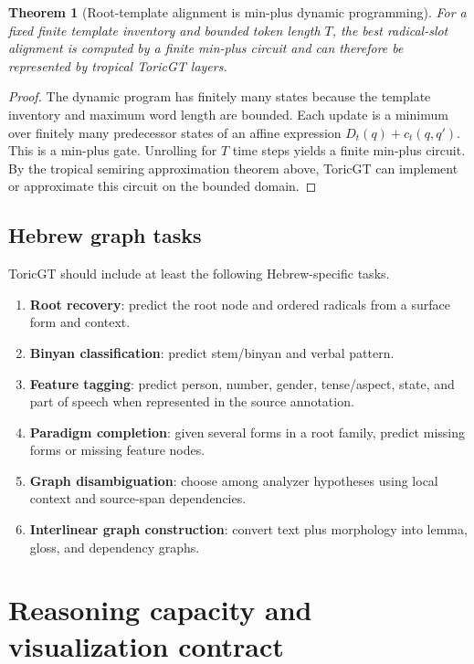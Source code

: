 \documentclass[11pt]{article}
\theoremstyle{definition}
\theoremstyle{plain}
\newtheorem{theorem}[definition]{Theorem}
\theoremstyle{remark}
\numberwithin{equation}{section}
\begin{document}
\begin{theorem}[Root-template alignment is min-plus dynamic programming]
For a fixed finite template inventory and bounded token length $T$, the best radical-slot alignment is computed by a finite min-plus circuit and can therefore be represented by tropical ToricGT layers.
\end{theorem}

\begin{proof}
The dynamic program has finitely many states because the template inventory and maximum word length are bounded.  Each update is a minimum over finitely many predecessor states of an affine expression $D_t(q)+c_t(q,q')$.  This is a min-plus gate.  Unrolling for $T$ time steps yields a finite min-plus circuit.  By the tropical semiring approximation theorem above, ToricGT can implement or approximate this circuit on the bounded domain.
\end{proof}

\subsection{Hebrew graph tasks}

ToricGT should include at least the following Hebrew-specific tasks.
\begin{enumerate}[leftmargin=2em]
  \item \textbf{Root recovery}: predict the root node and ordered radicals from a surface form and context.
  \item \textbf{Binyan classification}: predict stem/binyan and verbal pattern.
  \item \textbf{Feature tagging}: predict person, number, gender, tense/aspect, state, and part of speech when represented in the source annotation.
  \item \textbf{Paradigm completion}: given several forms in a root family, predict missing forms or missing feature nodes.
  \item \textbf{Graph disambiguation}: choose among analyzer hypotheses using local context and source-span dependencies.
  \item \textbf{Interlinear graph construction}: convert text plus morphology into lemma, gloss, and dependency graphs.
\end{enumerate}

\section{Reasoning capacity and visualization contract}
\end{document}
